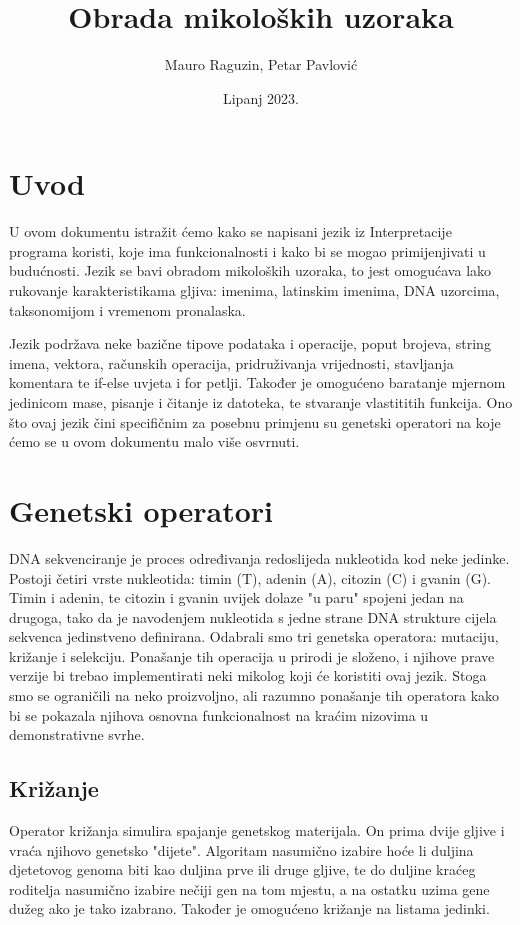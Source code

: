 \documentclass[12pt]{scrartcl}
\title{Obrada mikoloških uzoraka}
\author{Mauro Raguzin, Petar Pavlović}
\date{Lipanj 2023.}
\begin{document}
\maketitle

\section{Uvod}
U ovom dokumentu istražit ćemo kako se napisani jezik iz Interpretacije programa koristi, koje ima
funkcionalnosti i kako bi se mogao primijenjivati u budućnosti. Jezik se bavi obradom mikoloških uzoraka,
to jest omogućava lako rukovanje karakteristikama gljiva: imenima, latinskim imenima, DNA uzorcima,
taksonomijom i vremenom pronalaska.

Jezik podržava neke bazične tipove podataka i operacije, poput brojeva, string imena, vektora,
računskih operacija, pridruživanja vrijednosti, stavljanja komentara te if-else uvjeta i for petlji.
Također je omogućeno baratanje mjernom jedinicom mase, pisanje i čitanje iz datoteka, te stvaranje
vlastititih funkcija.
Ono što ovaj jezik čini specifičnim za posebnu primjenu su genetski operatori na koje ćemo se u ovom
dokumentu malo više osvrnuti. 

\section{Genetski operatori}
DNA sekvenciranje je proces određivanja redoslijeda nukleotida kod neke jedinke. Postoji četiri vrste
nukleotida: timin (T), adenin (A), citozin (C) i gvanin (G). Timin i adenin, te citozin i gvanin uvijek
dolaze "u paru" spojeni jedan na drugoga, tako da je navodenjem nukleotida s jedne strane DNA strukture
cijela sekvenca jedinstveno definirana. Odabrali smo tri genetska operatora: mutaciju, križanje i
selekciju. Ponašanje tih operacija u prirodi je složeno, i njihove prave verzije bi trebao implementirati
neki mikolog koji će koristiti ovaj jezik. Stoga smo se ograničili na neko proizvoljno, ali razumno
ponašanje tih operatora kako bi se pokazala njihova osnovna funkcionalnost na kraćim nizovima u
demonstrativne svrhe.
\subsection{Križanje}
Operator križanja simulira spajanje genetskog materijala. On prima dvije gljive i vraća njihovo genetsko
"dijete". Algoritam nasumično izabire hoće li duljina djetetovog genoma biti kao duljina prve ili druge
gljive, te do duljine kraćeg roditelja nasumično izabire nečiji gen na tom mjestu, a na ostatku uzima gene
dužeg ako je tako izabrano. Također je omogućeno križanje na listama jedinki.
\end{document}
